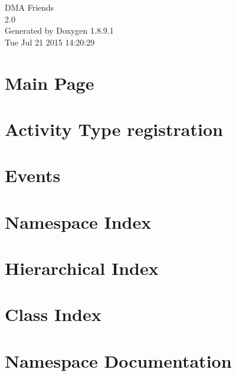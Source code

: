 \documentclass[twoside]{book}
\newcommand{\+}{\discretionary{\mbox{\scriptsize$\hookleftarrow$}}{}{}}
\newcommand{\clearemptydoublepage}{%
  \newpage{\pagestyle{empty}\cleardoublepage}%
}
\begin{document}
\hypersetup{pageanchor=false,
             bookmarks=true,
             bookmarksnumbered=true,
             pdfencoding=unicode
            }
\begin{titlepage}
\vspace*{7cm}
\begin{center}%
{\Large D\+M\+A Friends \\[1ex]\large 2.\+0 }\\
\vspace*{1cm}
{\large Generated by Doxygen 1.8.9.1}\\
\vspace*{0.5cm}
{\small Tue Jul 21 2015 14:20:29}\\
\end{center}
\end{titlepage}
\clearemptydoublepage
\tableofcontents
\clearemptydoublepage
{}
\hypersetup{pageanchor=true}

\chapter{Main Page}
\label{index}\hypertarget{index}{}
\chapter{Activity Type registration}
\label{df/d06/md_docs_ACTIVITY-TYPES}
\hypertarget{df/d06/md_docs_ACTIVITY-TYPES}{}

\chapter{Events}
\label{df/d0e/md_docs_EVENTS}
\hypertarget{df/d0e/md_docs_EVENTS}{}

\chapter{Namespace Index}

\chapter{Hierarchical Index}

\chapter{Class Index}

\chapter{Namespace Documentation}




\end{document}
